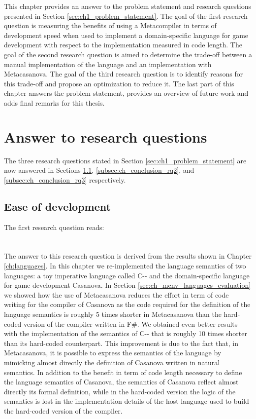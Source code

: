 This chapter provides an answer to the problem statement and research questions presented in Section \ref{sec:ch1_problem_statement}. The goal of the first research question is measuring the benefits of using a Metacompiler in terms of development speed when used to implement a domain-specific language for game development with respect to the implementation measured in code length. The goal of the second research question is aimed to determine the trade-off between a manual implementation of the language and an implementation with Metacasanova. The goal of the third research question is to identify reasons for this trade-off and propose an optimization to reduce it. The last part of this chapter answers the problem statement, provides an overview of future work and adds final remarks for this thesis.

\section{Answer to research questions}
\label{sec:ch_conclusion_answer_research_questions}
The three research questions stated in Section \ref{sec:ch1_problem_statement} are now answered  in Sections \ref{subsec:ch_conclusion_rq1}, \ref{subsec:ch_conclusion_rq2}, and \ref{subsec:ch_conclusion_rq3} respectively.

\subsection{Ease of development}
\label{subsec:ch_conclusion_rq1}

The first research question reads:\\\\
\\

The answer to this research question is derived from the results shown in Chapter \ref{ch:languages}. In this chapter we re-implemented the language semantics of two languages: a toy imperative language called C-{}- and the domain-specific language for game development Casanova. In Section \ref{sec:ch_mcnv_languages_evaluation} we showed how the use of Metacasanova reduces the effort in term of code writing for the compiler of Casanova as the code required for the definition of the language semantics is roughly 5 times shorter in Metacasanova than the hard-coded version of the compiler written in F\#. We obtained even better results with the implementation of the semantics of C-{}- that is roughly 10 times shorter than its hard-coded counterpart. This improvement is due to the fact that, in Metacasanova, it is possible to express the semantics of the language by mimicking almost directly the definition of Casanova written in natural semantics. In addition to the benefit in term of code length necessary to define the language semantics of Casanova, the semantics of Casanova reflect almost directly its formal definition, while in the hard-coded version the logic of the semantics is lost in the implementation details of the host language used to build the hard-coded version of the compiler.

